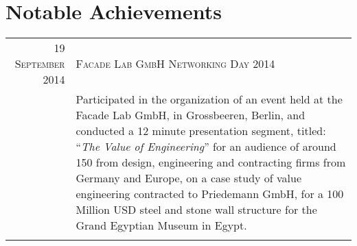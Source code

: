 \documentclass[a4paper,11pt]{article} %
\begin{document}

\vspace{0.5cm}
\section{Notable Achievements}

\begin{tabular}{r|p{11cm}}
\textsc{19 September 2014} & \textsc{Facade Lab GmbH Networking Day 2014}\\ 
& \footnotesize{Participated in the organization of an event held at the Facade Lab GmbH, in Grossbeeren, Berlin, and conducted a 12 minute presentation segment, titled: ``\emph{The Value of Engineering}'' for an audience of around 150 from design, engineering and contracting firms from Germany and Europe, on a case study of value engineering contracted to Priedemann GmbH, for a 100 Million USD steel and stone wall structure for the Grand Egyptian Museum in Egypt.}\\
\multicolumn{2}{c}{} \\
\end{tabular}
\end{document}
